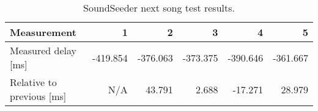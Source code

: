 \begin{table}[h]
\centering
\begin{tabular}{|l|r|r|r|r|r|}
\hline
Measurement          		& 1       	& 2       	& 3       & 4       & 5       \\ \hline
Measured delay [ms]       	& -419.854 	& -376.063 	& -373.375 & -390.646 & -361.667 \\ \hline
Relative to previous [ms] 	& N/A     	& 43.791 	& 2.688  & -17.271  & 28.979  \\ \hline
\end{tabular}
\caption{SoundSeeder next song test results.}
\label{fig:soundseedernextsongfigure}
\end{table}
